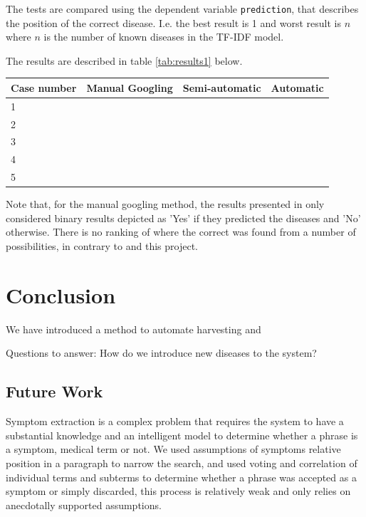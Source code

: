 \documentclass[10pt,letterpaper,final]{article}
\begin{document}
The tests are compared using the dependent variable \texttt{prediction},
that describes the position of the correct disease. I.e. the best result
is 1 and worst result is $n$ where $n$ is the number of known diseases
in the TF-IDF model.

The results are described in table \ref{tab:results1} below.
\begin{center}
	\begin{tabular}{llll}
		Case number & Manual Googling & Semi-automatic & Automatic \\ \hline
		1 &  &  &  \\
		2 &  &  &  \\
		3 &  &  &  \\
		4 &  &  &  \\
		5 &  &  &  \\
	\end{tabular}
	\label{tab:results1}
\end{center}
Note that, for the manual googling method, the results presented in
\cite{googlingdiagnosis} only considered binary results depicted as
'Yes' if they predicted the diseases and 'No' otherwise. There is no
ranking of where the correct was found from a number of possibilities,
in contrary to \cite{jensenandersen} and this project.



\section{Conclusion}
We have introduced a method to automate harvesting and 

Questions to answer: How do we introduce new diseases to the system?


\subsection{Future Work}
Symptom extraction is a complex problem that requires the system to have
a substantial knowledge and an intelligent model to determine whether a
phrase is a symptom, medical term or not. We used assumptions of
symptoms relative position in a paragraph to narrow the search, and used
voting and correlation of individual terms and subterms to determine
whether a phrase was accepted as a symptom or simply discarded, this
process is relatively weak and only relies on anecdotally supported
assumptions.
\end{document}
